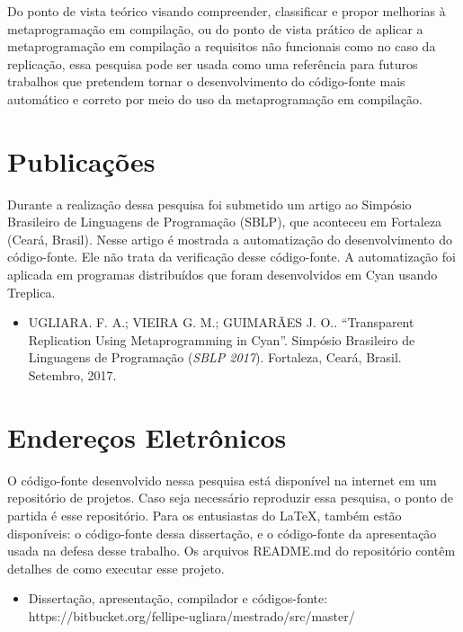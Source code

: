 Do ponto de vista teórico visando compreender, classificar e propor melhorias à metaprogramação em compilação, ou do ponto de vista prático de aplicar a metaprogramação em compilação a requisitos não funcionais como no caso da replicação, essa pesquisa pode ser usada como uma referência para futuros trabalhos que pretendem tornar o desenvolvimento do código-fonte mais automático e correto por meio do uso da metaprogramação em compilação.

\section*{Publicações}

Durante a realização dessa pesquisa foi submetido um artigo ao Simpósio Brasileiro de Linguagens de Programação (SBLP), que aconteceu em Fortaleza (Ceará, Brasil). Nesse artigo é mostrada a automatização do desenvolvimento do código-fonte. Ele não trata da verificação desse código-fonte. A automatização foi aplicada em programas distribuídos que foram desenvolvidos em Cyan usando Treplica.

\begin{itemize}
	\item UGLIARA. F. A.; VIEIRA G. M.; GUIMARÃES J. O.. ``Transparent Replication Using Metaprogramming in Cyan''. Simpósio Brasileiro de Linguagens de Programação (\textit{SBLP 2017}). Fortaleza, Ceará, Brasil. Setembro, 2017.
\end{itemize}

\section*{Endereços Eletrônicos}

O código-fonte desenvolvido nessa pesquisa está disponível na internet em um repositório de projetos. Caso seja necessário reproduzir essa pesquisa, o ponto de partida é esse repositório. Para os entusiastas do \LaTeX, também estão disponíveis: o  código-fonte dessa dissertação, e o código-fonte da apresentação usada na defesa desse trabalho. Os arquivos README.md do repositório contêm detalhes de como executar esse projeto.

\begin{itemize}
	\item Dissertação, apresentação, compilador e códigos-fonte:\\ 
    https://bitbucket.org/fellipe-ugliara/mestrado/src/master/
\end{itemize}
